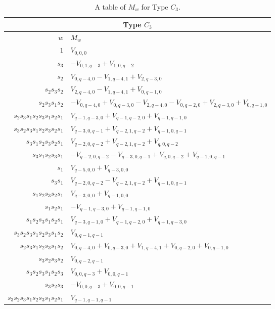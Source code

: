 \documentclass{amsart}
\theoremstyle{definition}
\begin{document}
\begin{table}
\renewcommand{\arraystretch}{1.5}
\caption{A table of $M_w$ for Type $C_3$.\label{tab:c3}}
\begin{tabular}{|r|l|}
\hline
\multicolumn{2}{||c||}{Type $C_3$}\\
\hline $w$ & $M_w$\\
\hline
    $1$ & $V_{0,0,0}$ \\
$s_3$ & $-V_{0,1,q-3} + V_{1,0,q-2}$ \\
$s_2$ & $V_{0,q-4,0} - V_{1,q-4,1} + V_{2,q-3,0}$ \\
$s_2s_3s_2$ & $V_{2,q-4,0} - V_{1,q-4,1} + V_{0,q-1,0}$ \\
$s_2s_3s_1s_2$ & $-V_{0,q-4,0} + V_{0,q-3,0} - V_{2,q-4,0} - V_{0,q-2,0} + V_{2,q-3,0} + V_{0,q-1,0}$ \\
$s_2s_3s_1s_2s_3s_1s_2s_1$ & $V_{q-1,q-3,0} + V_{q-1,q-2,0} + V_{q-1,q-1,0}$ \\
$s_3s_2s_3s_1s_2s_3s_2s_1$ & $V_{q-3,0,q-1} + V_{q-2,1,q-2} + V_{q-1,0,q-1}$ \\
$s_3s_1s_2s_3s_2s_1$ & $V_{q-2,0,q-2} + V_{q-2,1,q-2} + V_{q,0,q-2}$ \\
$s_3s_1s_2s_3s_1$ & $-V_{q-2,0,q-2} - V_{q-3,0,q-1} + V_{q,0,q-2} + V_{q-1,0,q-1}$ \\
$s_1$ & $V_{q-5,0,0} + V_{q-3,0,0}$ \\
$s_3s_1$ & $V_{q-2,0,q-2} - V_{q-2,1,q-2} + V_{q-1,0,q-1}$ \\
$s_1s_2s_3s_2s_1$ & $V_{q-3,0,0} + V_{q-1,0,0}$ \\
$s_1s_2s_1$ & $-V_{q-1,q-3,0} + V_{q-1,q-1,0}$ \\
$s_1s_2s_3s_1s_2s_1$ & $V_{q-3,q-1,0} + V_{q-1,q-2,0} + V_{q+1,q-3,0}$ \\
$s_3s_2s_3s_1s_2s_3s_1s_2$ & $V_{0,q-1,q-1}$ \\
$s_2s_3s_1s_2s_3s_1s_2$ & $V_{0,q-4,0} + V_{0,q-3,0} + V_{1,q-4,1} + V_{0,q-2,0} + V_{0,q-1,0}$ \\
$s_3s_2s_3s_2$ & $V_{0,q-2,q-1}$ \\
$s_3s_2s_3s_1s_2s_3$ & $V_{0,0,q-3} + V_{0,0,q-1}$ \\
$s_3s_2s_3$ & $-V_{0,0,q-3} + V_{0,0,q-1}$ \\
$s_3s_2s_3s_1s_2s_3s_1s_2s_1$ & $V_{q-1,q-1,q-1}$ \\
    \hline
\end{tabular}
\end{table}
\end{document}

